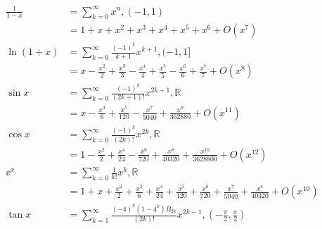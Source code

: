 \[
	\begin{aligned}
		\frac{1}{1-x}                              & = \sum_{k=0}^\infty x^n,(-1,1)                                                                                                                  \\
		                                           & = 1 + x + x^2 + x^3 + x^4 + x^5 + x^6 + O(x^7)                                                                                                  \\
		\ln(1+x)                                   & = \sum_{k=0}^\infty\frac{(-1)^k}{k+1}x^{k+1},(-1,1]                                                                                             \\
		                                           & = x - \frac{x^2}{2} + \frac{x^3}{3} - \frac{x^4}{4} + \frac{x^5}{5} - \frac{x^6}{6} + \frac{x^7}{7} + O(x^8)                                    \\
		\sin x                                     & = \sum_{k=0}^\infty \frac{(-1)^k}{(2k+1)!}x^{2k+1},\mathbb{R}                                                                                   \\
		                                           & = x - \frac{x^3}{6} + \frac{x^5}{120} - \frac{x^7}{5040} + \frac{x^9}{362880}+ O(x^{11})                                                        \\
		\cos x                                     & = \sum_{k=0}^\infty \frac{(-1)^k}{(2k)!}x^{2k},\mathbb{R}                                                                                       \\
		                                           & = 1 - \frac{x^2}{2} + \frac{x^4}{24} - \frac{x^6}{720} + \frac{x^8}{40320} + \frac{x^{10}}{3628800} + O(x^{12})                                 \\
		\ee^x                                      & = \sum_{k=0}^\infty\frac{1}{k!}x^k,\mathbb{R}                                                                                                   \\
		                                           & = 1 + x + \frac{x^2}{2} + \frac{x^3}{6} + \frac{x^4}{24} + \frac{x^5}{120} + \frac{x^6}{720} + \frac{x^7}{5040} + \frac{x^8}{40320} + O(x^{10}) \\
		\tan x                                     & = \sum_{k=1}^\infty \frac{(-4)^k(1-4^k)B_{2k}}{(2k)!}x^{2k-1},(-\frac{\pi}{2},\frac{\pi}{2})                                                    \\

\end{aligned}\]
